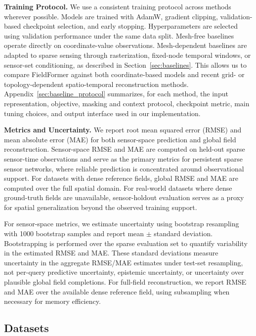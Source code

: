 \noindent\textbf{Training Protocol.}
We use a consistent training protocol across methods wherever possible. Models are trained with AdamW, gradient clipping, validation-based checkpoint selection, and early stopping. Hyperparameters are selected using validation performance under the same data split. Mesh-free baselines operate directly on coordinate-value observations. Mesh-dependent baselines are adapted to sparse sensing through rasterization, fixed-node temporal windows, or sensor-set conditioning, as described in Section~\ref{sec:baselines}. This allows us to compare FieldFormer against both coordinate-based models and recent grid- or topology-dependent spatio-temporal reconstruction methods. Appendix~\ref{sec:baseline_protocol} summarizes, for each method, the input representation, objective, masking and context protocol, checkpoint metric, main tuning choices, and output interface used in our implementation.

\noindent\textbf{Metrics and Uncertainty.}
We report root mean squared error (RMSE) and mean absolute error (MAE) for both sensor-space prediction and global field reconstruction. Sensor-space RMSE and MAE are computed on held-out sparse sensor-time observations and serve as the primary metrics for persistent sparse sensor networks, where reliable prediction is concentrated around observational support. For datasets with dense reference fields, global RMSE and MAE are computed over the full spatial domain. For real-world datasets where dense ground-truth fields are unavailable, sensor-holdout evaluation serves as a proxy for spatial generalization beyond the observed training support.

For sensor-space metrics, we estimate uncertainty using bootstrap resampling with 1000 bootstrap samples and report mean $\pm$ standard deviation. Bootstrapping is performed over the sparse evaluation set to quantify variability in the estimated RMSE and MAE. These standard deviations measure uncertainty in the aggregate RMSE/MAE estimates under test-set resampling, not per-query predictive uncertainty, epistemic uncertainty, or uncertainty over plausible global field completions. For full-field reconstruction, we report RMSE and MAE over the available dense reference field, using subsampling when necessary for memory efficiency. 


\subsection{Datasets}
\label{sec:datasets}

